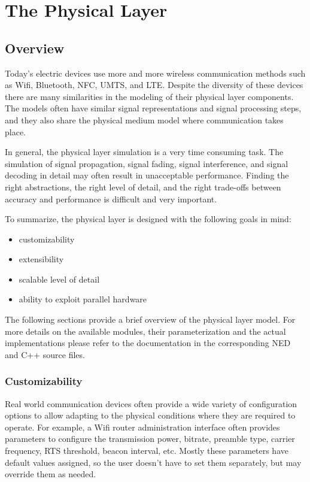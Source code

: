 \chapter{The Physical Layer}
\label{cha:physicallayer}

\section{Overview}

Today's electric devices use more and more wireless communication methods such
as Wifi, Bluetooth, NFC, UMTS, and LTE. Despite the diversity of these devices
there are many similarities in the modeling of their physical layer components.
The models often have similar signal representations and signal processing steps,
and they also share the physical medium model where communication takes place.

In general, the physical layer simulation is a very time consuming task. The
simulation of signal propagation, signal fading, signal interference, and signal
decoding in detail may often result in unacceptable performance. Finding the
right abstractions, the right level of detail, and the right trade-offs between
accuracy and performance is difficult and very important.

To summarize, the physical layer is designed with the following goals in mind:
\begin{itemize}
  \item customizability
  \item extensibility
  \item scalable level of detail
  \item ability to exploit parallel hardware
\end{itemize}

The following sections provide a brief overview of the physical layer model. For
more details on the available modules, their parameterization and the actual
implementations please refer to the documentation in the corresponding NED and
C++ source files.

\subsection{Customizability}

Real world communication devices often provide a wide variety of configuration
options to allow adapting to the physical conditions where they are required
to operate. For example, a Wifi router administration interface often provides
parameters to configure the transmission power, bitrate, preamble type, carrier
frequency, RTS threshold, beacon interval, etc. Mostly these parameters have
default values assigned, so the user doesn't have to set them separately, but
may override them as needed.

